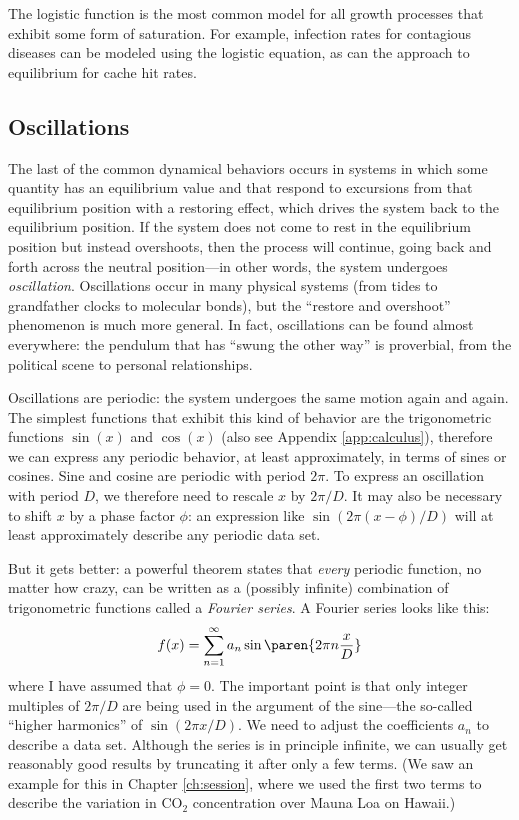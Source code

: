 The logistic function is the most common model for all growth
processes that exhibit some form of saturation. For example, infection
rates for contagious diseases can be modeled using the logistic
equation, as can the approach to equilibrium for cache hit rates.

\subsection{Oscillations}

 
The last of the common dynamical behaviors occurs in systems in which
some quantity has an equilibrium value and that respond to excursions
from that equilibrium position with a restoring effect, which drives
the system back to the equilibrium position. If the system does not
come to rest in the equilibrium position but instead overshoots, then
the process will continue, going back and forth across the neutral
position---in other words, the system undergoes \emph{oscillation}.
Oscillations occur in many physical systems (from tides to grandfather
clocks to molecular bonds), but the ``restore and overshoot''
phenomenon is much more general. In fact, oscillations can be found
almost everywhere: the pendulum that has ``swung the other way'' is
proverbial, from the political scene to personal relationships.

Oscillations are periodic: the system undergoes the same motion again
and again. The simplest functions that exhibit this kind of behavior
are the trigonometric functions $\sin(x)$ and $\cos(x)$ (also see
Appendix \ref{app:calculus}), therefore we can express any periodic
behavior, at least approximately, in terms of sines or cosines. Sine
and cosine are periodic with period $2 \pi$. To express an oscillation
with period $D$, we therefore need to rescale $x$ by $2 \pi/D$. It may
also be necessary to shift $x$ by a phase factor $\phi$: an expression
like $\sin( 2 \pi (x-\phi)/D )$ will at least approximately describe
any periodic data set.

But it gets better: a powerful theorem states that \emph{every}
periodic function, no matter how crazy, can be written as a (possibly
infinite) combination of trigonometric functions called a
\emph{Fourier series}.  A Fourier series looks like this:
%
\[
f(x) = \sum_{n=1}^\infty a_n \sin\paren{2 \pi n \frac{x}{D}}
\]
%
where I have assumed that $\phi = 0$. The important point is that only
integer multiples of $2 \pi/D$ are being used in the argument of the
sine---the so-called ``higher harmonics'' of $\sin(2 \pi x/D)$.  We
need to adjust the coefficients $a_n$ to describe a data set.
Although the series is in principle infinite, we can usually get
reasonably good results by truncating it after only a few terms. (We
saw an example for this in Chapter \ref{ch:session}, where we used the
first two terms to describe the variation in $\mathrm{CO}_2$
concentration over Mauna Loa on Hawaii.)

